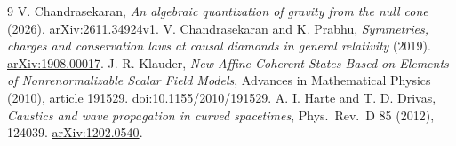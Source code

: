 \documentclass[11pt,letterpaper]{article}
\begin{document}
\begin{thebibliography}{9}
 V. Chandrasekaran, \emph{An algebraic quantization of gravity from the null cone} (2026). \href{https://arxiv.org/abs/2611.34924v1}{arXiv:2611.34924v1}.
 V. Chandrasekaran and K. Prabhu, \emph{Symmetries, charges and conservation laws at causal diamonds in general relativity} (2019). \href{https://arxiv.org/abs/1908.00017}{arXiv:1908.00017}.
 J. R. Klauder, \emph{New Affine Coherent States Based on Elements of Nonrenormalizable Scalar Field Models}, Advances in Mathematical Physics (2010), article 191529. \href{https://doi.org/10.1155/2010/191529}{doi:10.1155/2010/191529}.
 A. I. Harte and T. D. Drivas, \emph{Caustics and wave propagation in curved spacetimes}, Phys.\ Rev.\ D 85 (2012), 124039. \href{https://arxiv.org/abs/1202.0540}{arXiv:1202.0540}.
\end{thebibliography}
\end{document}
